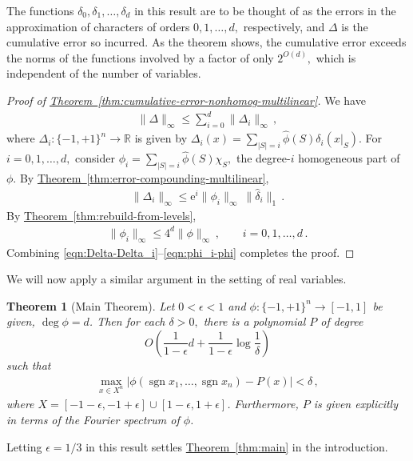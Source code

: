 \documentclass[10pt]{article}
\newtheorem{theorem}{Theorem}[section]
\theoremstyle{definition}
\numberwithin{equation}{section}
\newcommand{\R}{{\mathbb R}}
\newcommand{\expref}[2]{\texorpdfstring{\hyperref[#2]{#1~\ref{#2}}}{#1~\ref{#2}}}
\newcommand{\moo}{\{-1,+1\}}
\newcommand{\moon}{\moo^n}
\DeclareMathOperator{\sign}{sgn}
\newcommand{\e}{\mathrm{e}}  %
\begin{document}
The functions $\delta_0,\delta_1,\dots,\delta_d$ in
this result are to be thought of as the errors in the approximation of 
characters of orders $0,1,\dots,d,$ respectively, and
$\Delta$ is the cumulative error so incurred.
As the theorem shows, the
cumulative error exceeds the norms of the functions
involved by a factor of only $2^{O(d)},$ which is
independent of the number of variables.

\begin{proof}
[Proof of \expref{Theorem}{thm:cumulative-error-nonhomog-multilinear}]
We have 
\begin{align}
\|\Delta\|_\infty \leq
\sum_{i=0}^d\|\Delta_i\|_\infty\,,
\label{eqn:Delta-Delta_i}
\end{align}
where $\Delta_i\colon\moon\to\R$ is given by
$\Delta_i(x) = \sum_{|S|=i}\hat\phi(S)\delta_i(x|_S)$.
For $i=0,1,\dots,d,$ consider 
$\phi_i=\sum_{|S|=i}\hat\phi(S)\chi_S,$ the
degree-$i$ homogeneous part of $\phi$.
By \expref{Theorem}{thm:error-compounding-multilinear},
\begin{align}
\|\Delta_i\|_\infty \leq \e^i \|\phi_i\|_\infty\:
\|\hat\delta_i\|_1\,.
\end{align}
By \expref{Theorem}{thm:rebuild-from-levels},
\begin{align}
\|\phi_i\|_\infty \leq 4^d \|\phi\|_\infty\,, \qquad
i=0,1,\dots,d\,.
\label{eqn:phi_i-phi}
\end{align}
Combining
\eqref{eqn:Delta-Delta_i}--\eqref{eqn:phi_i-phi}
completes the proof.
\end{proof}


We will now apply a similar argument in the setting of
real variables. 

%
\begin{theorem}[Main Theorem]
Let $0<\epsilon<1$ and $\phi\colon\moon\to[-1,1]$ be given,
$\deg\phi=d$. 
Then for each $\delta>0,$ there is a
polynomial $P$ of degree
\[
O\left(\frac1{1-\epsilon}
d+\frac1{1-\epsilon} \log \frac1\delta\right)
\]
such that 
\begin{align}
   \max_{x\in X^n}\left|\phi(\sign x_1,\dots,\sign
   x_n)-P(x)\right| <\delta\,,
   \label{eqn:P-main-technical}
\end{align}
where $X=[-1-\epsilon,-1+\epsilon]\cup
         [1-\epsilon,1+\epsilon]$.
Furthermore, $P$ is given explicitly in terms of the
Fourier spectrum of $\phi$. 
\end{theorem}
%

Letting $\epsilon=1/3$ in this result settles \expref{Theorem}{thm:main} in the introduction. 
\end{document}
